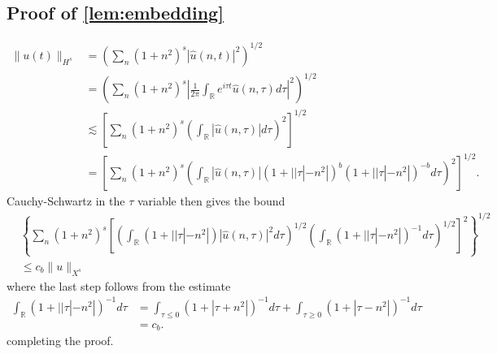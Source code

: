 \documentclass[12pt,reqno]{amsart}
\numberwithin{equation}{section}  %
\newcommand{\rr}{\mathbb{R}}
\newcommand{\wh}{\widehat}
\begin{document}
\begin{appendices}
\subsection{Proof of \cref{lem:embedding}} 
\label{ssec:embedding-pf}
%
%
\begin{equation*}
\begin{split}
  \| u(t) \|_{H^{s}}
  & = \left( \sum_{n} (1 + n^{2})^{s} |
  \wh{u}(n, t) |^{2} \right)^{1/2}
  \\
  & = \left( \sum_{n} (1 + n^{2})^{s} | \frac{1}{2\pi}
  \int_{\rr}e^{i \tau t} \wh{u}(n, \tau) d \tau |^{2} \right)^{1/2}
  \\
  & \lesssim \left[ \sum_{n} (1 + n^{2})^{s} \left( \int_{\rr} |
  \wh{u}(n, \tau)
  | d \tau \right)^{2} \right]^{1/2}
  \\
  & = \left[ \sum_{n} (1 + n^{2})^{s} \left( \int_{\rr} |
  \wh{u}(n, \tau)
  | (1 + | | \tau | - n^{2} |)^{b} (1 + | | \tau | - n^{2} |)^{-b} d \tau
  \right)^{2} \right]^{1/2}.
\end{split}
\end{equation*}
%
%
Cauchy-Schwartz in the $\tau$ variable then gives the bound
%
%
\begin{equation*}
\begin{split}
  & \left \{\sum_{n} (1 + n^{2})^{s} \left[ \left( \int_{\rr} (1 + | |
  \tau | - n^{2}
  |) | \wh{u}(n, \tau) |^{2} d \tau  \right)^{1/2} 
 \left( \int_{\rr} (1 + | |
  \tau | - n^{2}
  |)^{-1}  d \tau  \right)^{1/2}
  \right]^{2}\right \}^{1/2}
  \\
  & \le c_{b} \| u \|_{X^{s}}
\end{split}
\end{equation*}
%
where the last step follows from the estimate
%
%
%
%
\begin{equation*}
\begin{split}
\int_{\rr} (1 + | |
  \tau | - n^{2}
  |)^{-1}  d \tau 
  & = \int_{\tau \le 0} (1 + 
  |\tau  + n^{2}
  |)^{-1}  d \tau  + \int_{\tau \ge 0} (1 + | 
  \tau - n^{2}
  |)^{-1}  d \tau
  \\
  & = c_{b}.
\end{split}
\end{equation*}
%
%
completing the proof. \qquad \qedsymbol
%

\end{appendices}
\end{document}
